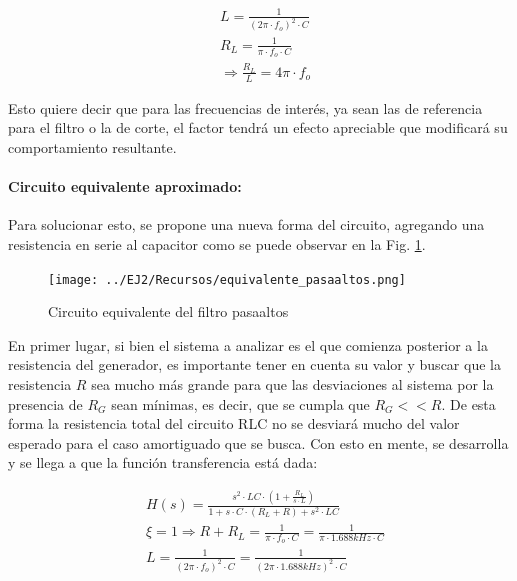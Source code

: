 \begin{align*}
    & L = \frac{1}{(2 \pi \cdot f_o)^{2} \cdot C} \\
    & R_L = \frac{1}{\pi \cdot f_o \cdot C} \\
    & \Rightarrow \frac{R_L}{L} = 4 \pi \cdot f_o
\end{align*}

Esto quiere decir que para las frecuencias de inter\'es, ya sean las de referencia para el filtro o la de corte, el factor tendr\'a un efecto apreciable que modificar\'a
su comportamiento resultante. 

\paragraph*{Circuito equivalente aproximado:} Para solucionar esto, se propone una nueva forma del circuito, agregando una resistencia en serie al capacitor como se puede observar en la Fig. \ref{fig:equivalente_pasaaltos}.

\begin{figure}[H]
    \centering
    \texttt{[image: ../EJ2/Recursos/equivalente\_pasaaltos.png]}
    \caption{Circuito equivalente del filtro pasaaltos}
    \label{fig:equivalente_pasaaltos}
\end{figure}

En primer lugar, si bien el sistema a analizar es el que comienza posterior a la resistencia del generador, es importante tener en cuenta su valor y buscar que la resistencia
$R$ sea mucho m\'as grande para que las desviaciones al sistema por la presencia de $R_G$ sean m\'inimas, es decir, que se cumpla que $R_G << R$. De esta forma la resistencia total
del circuito RLC no se desviar\'a mucho del valor esperado para el caso amortiguado que se busca. Con esto en mente, se desarrolla y se llega a que la funci\'on transferencia est\'a dada:

\begin{align}
    & H(s) = \frac{s^{2} \cdot LC \cdot (1 + \frac{R_L}{s \cdot L})}{1 + s \cdot C \cdot (R_L + R) + s^{2} \cdot LC} \\
    & \xi = 1 \Rightarrow R + R_L = \frac{1}{\pi \cdot f_o \cdot C} = \frac{1}{\pi \cdot 1.688kHz \cdot C}\\
    & L = \frac{1}{(2 \pi \cdot f_o)^{2} \cdot C} = \frac{1}{(2 \pi \cdot 1.688kHz)^{2} \cdot C}
\end{align}

